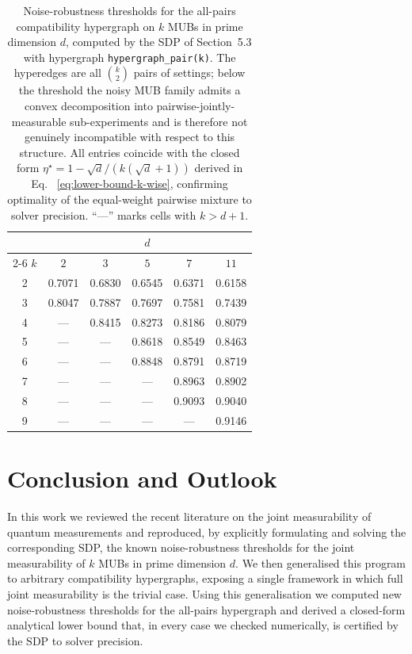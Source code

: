 \documentclass[oneside, a4paper, onecolumn, 11pt]{article}
\theoremstyle{definition}
\theoremstyle{plain}
\theoremstyle{remark}
\begin{document}
\begin{table}[h]
  \centering
  \caption{Noise-robustness thresholds for the all-pairs compatibility hypergraph on $k$ MUBs in prime dimension $d$, computed 
  by the SDP of Section~5.3 with hypergraph \texttt{hypergraph\_pair(k)}. The 
  hyperedges are all $\binom{k}{2}$ pairs of settings; below the threshold the noisy MUB family admits a convex decomposition 
  into pairwise-jointly-measurable sub-experiments and is therefore not genuinely incompatible with respect to 
  this structure. All entries coincide with the closed form $\eta^\star = 1 - \sqrt{d}/(k(\sqrt{d}+1))$ derived in 
  Eq. ~\ref{eq:lower-bound-k-wise}, confirming optimality of the equal-weight pairwise mixture to solver precision. ``---'' marks cells with $k > d+1$.}
  \label{tab:pairwise-compat}
  \renewcommand{\arraystretch}{1.4}
  \begin{tabular}{c|ccccc}
    \hline
        & \multicolumn{5}{c}{$d$} \\
    \cline{2-6}
    $k$ & $2$ & $3$ & $5$ & $7$ & $11$ \\
    \hline
    2  &  0.7071  &  0.6830  &  0.6545  &  0.6371  &  0.6158   \\
    3  &  0.8047  &  0.7887  &  0.7697  &  0.7581  &  0.7439   \\
    4  &    ---     &  0.8415  &  0.8273  &  0.8186  &  0.8079   \\
    5  &    ---     &    ---     &  0.8618  &  0.8549  &  0.8463   \\
    6  &    ---     &    ---     &  0.8848  &  0.8791  &  0.8719   \\
    7  &    ---     &    ---     &    ---     &  0.8963  &  0.8902   \\
    8  &    ---     &    ---     &    ---     &  0.9093  &  0.9040   \\
    9  &    ---     &    ---     &    ---     &    ---     &  0.9146  \\
    \hline
  \end{tabular}
\end{table}

\FloatBarrier   %

\section{Conclusion and Outlook}

In this work we reviewed the recent literature on the joint
measurability of quantum measurements and reproduced, by explicitly
formulating and solving the corresponding SDP, the known
noise-robustness thresholds for the joint measurability of $k$ MUBs in
prime dimension $d$. We then generalised this program to arbitrary
compatibility hypergraphs, exposing a single framework in which full
joint measurability is the trivial case. Using this
generalisation we computed new noise-robustness thresholds for the
all-pairs hypergraph and derived a closed-form analytical lower bound
that, in every case we checked numerically, is certified by the SDP to
solver precision.
\end{document}
